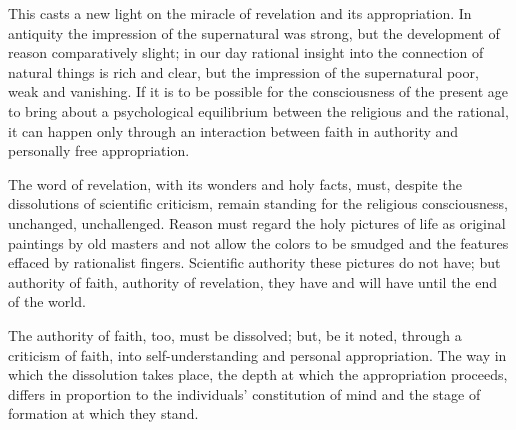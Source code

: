 \documentclass[12pt,a4paper,openany]{book}
\newcommand{\opage}[1]{\marginnote{\footnotesize\textit{[#1]}}}
\begin{document}
\opage{40}This casts a new light on the miracle of revelation and its
appropriation. In antiquity the impression of the supernatural was
strong, but the development of reason comparatively slight; in our day
rational insight into the connection of natural things is rich and
clear, but the impression of the supernatural poor, weak and vanishing.
If it is to be possible for the consciousness of the present age to
bring about a psychological equilibrium between the religious and the
rational, it can happen only through an interaction between faith in
authority and personally free appropriation.

The word of revelation, with its wonders and holy facts, must, despite
the dissolutions of scientific criticism, remain standing for the
religious consciousness, unchanged, unchallenged. Reason must regard the
holy pictures of life as original paintings by old masters and not allow
the colors to be smudged and the features effaced by rationalist
fingers. Scientific authority these pictures do not have; but authority
of faith, authority of revelation, they have and will have until the end
of the world.

The authority of faith, too, must be dissolved; but, be it noted,
through a criticism of faith, into self-understanding and personal
appropriation. The way in which the dissolution takes place, the depth at
which the appropriation proceeds, differs in proportion to the
individuals' constitution of mind and the stage of formation at which
they stand.
\end{document}
